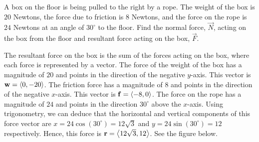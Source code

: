 \documentclass[handout]{ximera}
\begin{document}
\begin{example}
A box on the floor is being pulled to the right by a rope. The weight of the box is $20$ Newtons, the force due to friction is $8$ Newtons, and the 
force on the rope is $24$ Newtons at an angle of $30^\circ$ to the floor. Find the normal force, $\vec{N}$, acting on the box from the 
floor and resultant force acting on the box, $\vec{F}$.\\
\begin{image}  
\end{image}


The resultant force on the box is the sum of the forces acting on the box, where each force is represented by a vector.
The force of the weight of the box has a magnitude of $20$ and points in the direction of the negative $y$-axis.  
This vector is $\mathbf{w} = \left\langle 0,-20\right\rangle$.
The friction force has a magnitude of $8$ and points in the direction of the negative $x$-axis.  This vector is $\mathbf{f} = \left\langle -8,0\right\rangle$.
The force on the rope has a magnitude of $24$ and points in the direction $30^\circ$ above the $x$-axis. 
Using trigonometry, we can deduce that the horizontal and vertical components of this force vector are $x = 24\cos(30^\circ) = 12\sqrt 3$
and $y = 24\sin(30^\circ) = 12$ respectively. Hence, this force is $\mathbf r = \left\langle 12\sqrt 3, 12\right\rangle$.  See the figure below.

\begin{image}
\end{image}


\end{example}
\end{document}
